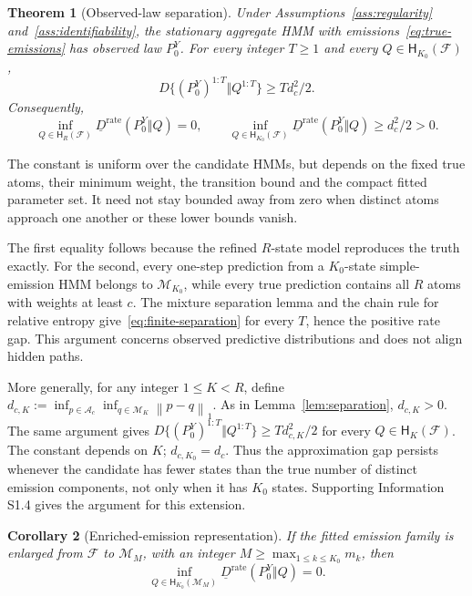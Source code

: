 \documentclass[11pt]{article}
\newtheorem{theorem}{Theorem}[section]
\newtheorem{corollary}[theorem]{Corollary}
\theoremstyle{definition}
\newcommand{\Fcal}{\mathcal{F}}
\newcommand{\Mcal}{\mathcal{M}}
\newcommand{\Acal}{\mathcal{A}}
\newcommand{\Hcal}{\mathsf{H}}
\newcommand{\norm}[1]{\left\lVert #1\right\rVert}
\begin{document}
\begin{theorem}[Observed-law separation]\label{thm:separation}
Under Assumptions~\ref{ass:regularity} and~\ref{ass:identifiability}, the
stationary aggregate HMM with emissions~\eqref{eq:true-emissions} has observed
law $P_0^Y$. For every integer $T\geq1$ and every
$Q\in\Hcal_{K_0}(\Fcal)$,
\begin{equation}\label{eq:finite-separation}
 D\{(P_0^Y)^{1:T}\Vert Q^{1:T}\}\geq T d_c^2/2.
\end{equation}
Consequently,
\begin{equation*}
 \inf_{Q\in\Hcal_R(\Fcal)}
 \underline D^{\mathrm{rate}}(P_0^Y\Vert Q)=0,
 \qquad
 \inf_{Q\in\Hcal_{K_0}(\Fcal)}
 \underline D^{\mathrm{rate}}(P_0^Y\Vert Q)\geq d_c^2/2>0.
\end{equation*}
\end{theorem}

The constant is uniform over the candidate HMMs, but depends on the fixed
true atoms, their minimum weight, the transition bound and the compact
fitted parameter set. It need not stay bounded away from zero when distinct
atoms approach one another or these lower bounds vanish.

The first equality follows because the refined $R$-state model reproduces the
truth exactly. For the second, every one-step prediction from a $K_0$-state
simple-emission HMM belongs to $\Mcal_{K_0}$, while every true prediction
contains all $R$ atoms with weights at least $c$. The mixture separation lemma
and the chain rule for relative entropy give~\eqref{eq:finite-separation}
for every $T$, hence the positive rate gap. This
argument concerns observed predictive distributions and does not align hidden
paths.

More generally, for any integer $1\leq K<R$, define
$d_{c,K}:=\inf_{p\in\Acal_c}\inf_{q\in\Mcal_K}\norm{p-q}_1$.
As in Lemma~\ref{lem:separation}, $d_{c,K}>0$. The same argument gives
$D\{(P_0^Y)^{1:T}\Vert Q^{1:T}\}\geq T d_{c,K}^2/2$
for every $Q\in\Hcal_K(\Fcal)$. The constant depends on $K$;
$d_{c,K_0}=d_c$. Thus the approximation gap persists whenever the candidate
has fewer states than the true number of distinct emission components,
not only when it has $K_0$ states. Supporting Information S1.4 gives the
argument for this extension.

\begin{corollary}[Enriched-emission representation]\label{cor:enriched}
If the fitted emission family is enlarged from $\Fcal$ to $\Mcal_M$, with an
integer $M\geq\max_{1\leq k\leq K_0}m_k$, then
\begin{equation*}
 \inf_{Q\in\Hcal_{K_0}(\Mcal_M)}
 \underline D^{\mathrm{rate}}(P_0^Y\Vert Q)=0.
\end{equation*}
\end{corollary}
\end{document}
